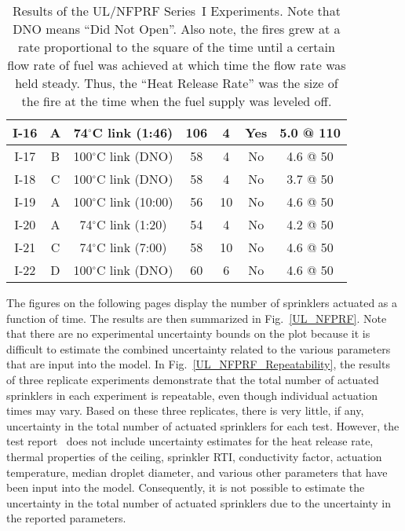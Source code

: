 \begin{table}[h!]
\begin{center}
\begin{tabular}{|c||c|c|c|c|c|c|}
I-16  & A  & 74$^\circ$C link (1:46)    & 106           & 4         & Yes  & 5.0 @ 110 \\ \hline \hline
I-17  & B  & 100$^\circ$C link (DNO)    & 58            & 4         & No   & 4.6 @ 50 \\ \hline
I-18  & C  & 100$^\circ$C link (DNO)    & 58            & 4         & No   & 3.7 @ 50 \\ \hline
I-19  & A  & 100$^\circ$C link (10:00)  & 56            & 10        & No   & 4.6 @ 50 \\ \hline
I-20  & A  & 74$^\circ$C link (1:20)    & 54            & 4         & No   & 4.2 @ 50 \\ \hline
I-21  & C  & 74$^\circ$C link (7:00)    & 58            & 10        & No   & 4.6 @ 50 \\ \hline
I-22  & D  & 100$^\circ$C link (DNO)    & 60            & 6         & No   & 4.6 @ 50 \\ \hline
\end{tabular}
\end{center}
\caption[Results of the UL/NFPRF Experiments, Series~I]
{Results of the UL/NFPRF Series~I Experiments. Note that DNO means
``Did Not Open''. Also note, the fires grew at a rate proportional
to the square of the time until a certain flow rate of fuel was achieved
at which time the flow rate was held steady. Thus, the ``Heat Release Rate''
was the size of the fire at the time when the fuel supply was leveled off.}
\label{ULmatrix}
\end{table}

The figures on the following pages display the number of sprinklers actuated as a function of time. The results are then summarized in Fig.~\ref{UL_NFPRF}. Note that there are no experimental uncertainty bounds on the plot because it is difficult to estimate the combined uncertainty related to the various parameters that are input into the model. In Fig.~\ref{UL_NFPRF_Repeatability}, the results of three replicate experiments
demonstrate that the total number of actuated sprinklers in each experiment is repeatable, even though individual actuation times may vary. Based on these three replicates, there is very little, if any, uncertainty in the total number of actuated sprinklers for each test. However, the test report~\cite{Sheppard:1} does not include uncertainty estimates for the heat release rate, thermal properties of the ceiling, sprinkler RTI, conductivity factor, actuation temperature, median droplet diameter, and various other parameters that have been input into the model. Consequently, it is not possible to estimate the uncertainty in the total number of actuated sprinklers due to the uncertainty in the reported parameters. 


